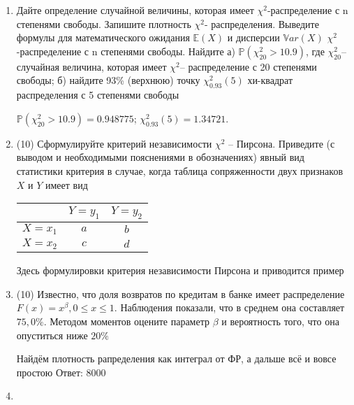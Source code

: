 \documentclass[a4paper,12pt]{article}
\begin{document}
\begin{enumerate}


\item


Дайте определение случайной величины, которая имеет $\chi ^{2}$-распределение с n степенями свободы.
Запишите плотность $\chi ^{2}$- распределения. Выведите формулы для математического ожидания $\mathbb{E}(X)$ и дисперсии $\mathbb{V}ar(X)$ $\chi ^{2}$-распределение с n степенями свободы. Найдите а) $\mathbb{P}(\chi _{20}^{2} > 10.9)$, где $\chi _{20}^{2}$–случайная величина, которая имеет $\chi ^{2}$– распределение с 20 степенями свободы; б) найдите 93\%
(верхнюю) точку $\chi _{0.93}^{2} (5)$ хи-квадрат распределения с 5 степенями свободы




$\mathbb{P}(\chi _{20}^{2} > 10.9) =  0.948775$; $\chi _{0.93}^{2} (5) = 1.34721$.


\item


(10) Сформулируйте критерий независимости $\chi ^ {2}$ – Пирсона. Приведите (с выводом и
необходимыми пояснениями в обозначениях) явный вид статистики критерия в случае, когда 
таблица сопряженности двух признаков $X$ и $Y$ имеет вид

\begin{tabular}[b]{ | c | c | c | }
\hline
$ $ & $Y = y _{1}$ & $Y = y _{2}$  \\ \hline
$X = x _{1}$ & $a$ & $b$ \\ \hline
$X = x _{2}$ & $c$ & $d$ \\
\hline
\end{tabular}




Здесь формулировки критерия независимости Пирсона и приводится пример


\item


(10) Известно, что доля возвратов по кредитам в банке имеет распределение $F(x) = x ^{\beta}, 0 \leqslant x \leqslant 1$.
Наблюдения показали, что в среднем она составляет $75,0\%$. Методом моментов оцените параметр $\beta$ и
вероятность того, что она опуститься ниже $20\%$




Найдём плотность рапределения как интеграл от ФР, а дальше всё и вовсе простою Ответ: $8000$


\item



\end{enumerate}
\end{document}
